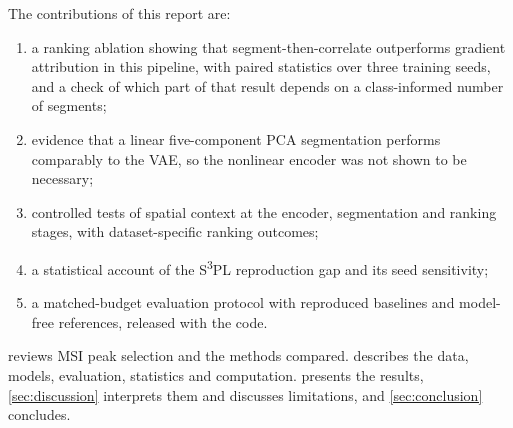 The contributions of this report are:
\begin{enumerate}
  \item a ranking ablation showing that segment-then-correlate outperforms
        gradient attribution in this pipeline, with paired statistics over
        three training seeds, and a check of which part of that result depends
        on a class-informed number of segments;
  \item evidence that a linear five-component PCA segmentation performs
        comparably to the VAE, so the nonlinear encoder was not shown to be
        necessary;
  \item controlled tests of spatial context at the encoder, segmentation and
        ranking stages, with dataset-specific ranking outcomes;
  \item a statistical account of the S\textsuperscript{3}PL reproduction gap and
        its seed sensitivity;
  \item a matched-budget evaluation protocol with reproduced baselines and
        model-free references, released with the code.
\end{enumerate}
 reviews MSI peak selection and the methods compared.
 describes the data, models, evaluation, statistics and
computation.  presents the results, \cref{sec:discussion}
interprets them and discusses limitations, and \cref{sec:conclusion}
concludes.
